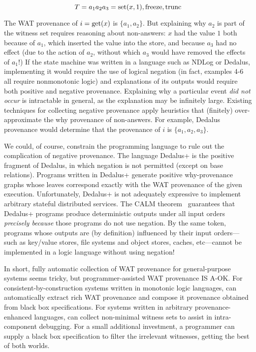 \[
  T = a_1 a_2 a_3 = \text{set}(x,1), \text{freeze}, \text{trunc}
\]

The WAT provenance of $i = \text{get}(x)$ is $\{a_1, a_2\}$.  But explaining why $a_2$ is part of the witness set requires reasoning about non-answers: $x$ had the value $1$ both because of $a_1$,
which inserted the value into the store, and because $a_3$ had no effect (due to the action of $a_2$, without which $a_3$ would have removed the effects of $a_1$!)
If the state machine was written in a language such as NDLog or Dedalus, implementing it would require the use of logical negation (in fact, examples 4-6 all require nonmonotonic logic) and explanations of its outputs would require both positive and negative provenance.  Explaining why a particular event \emph{did not occur} is intractable in general, as the explanation may be infinitely large.  Existing techniques for collecting negative provenance apply heuristics that (finitely) over-approximate the why provenance of non-answers.  For example, Dedalus provenance would determine that the provenance of $i$ is $\{a_1, a_2, a_3\}$.

We could, of course, constrain the programming language to rule out the complication of negative provenance.  The language Dedalus+\cite{marczak2012confluence} is the positive fragment of Dedalus, in which negation is not permitted (except on base relations).    Programs written in Dedalus+ generate positive why-provenance graphs whose leaves correspond exactly with the WAT provenance of the given execution. Unfortunately, Dedalus+ is not adequately expressive to implement arbitrary stateful distributed services.  The CALM theorem~\cite{alvaro2011consistency,ameloot2013transducers} guarantees that Dedalus+ programs produce deterministic outputs under all input orders \emph{precisely because} those programs do not use negation.  By the same token, programs whose outputs are (by definition) influenced by their input orders---such as key/value stores, file systems and object stores, caches, etc---cannot be implemented in a logic language without using negation!

In short, fully automatic collection of WAT provenance for general-purpose systems seems tricky, but programmer-assisted WAT provenance IS A-OK.  For consistent-by-construction systems written in monotonic logic languages, \fluent{} can automatically extract rich WAT provenance and compose it provenance obtained from black box specifications.  For systems written in arbitrary provenance-enhanced languages, \fluent{} can collect non-minimal witness sets to assist in intra-component debugging.  For a small additional investment, a programmer can supply a black box specification to filter the irrelevant witnesses, getting the best of both worlds.

